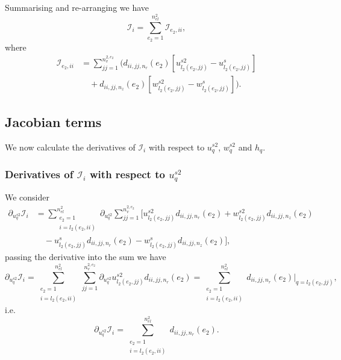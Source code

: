 \documentclass{article}
\begin{document}
Summarising and re-arranging we have
\begin{equation}
\mathcal{I}_i = \sum_{e_2=1}^{n_{el}^2} \mathcal{I}_{e_2,ii}, \tag{8.15}
\end{equation}
where
\begin{align}
\mathcal{I}_{e_2,ii} &= \sum_{jj=1}^{n_v^{2,e_2}} \Bigg( d_{ii,jj,n_r}(e_2) \left[ u_{l_2(e_2,jj)}^{s2} - u_{l_2(e_2,jj)}^s \right] \nonumber\\
&\quad + d_{ii,jj,n_z}(e_2) \left[ w_{l_2(e_2,jj)}^{s2} - w_{l_2(e_2,jj)}^s \right] \Bigg). \tag{8.16}
\end{align}

\subsection{Jacobian terms} %
We now calculate the derivatives of $\mathcal{I}_i$ with respect to $u_q^{s2}$, $w_q^{s2}$ and $h_q$.

\subsubsection{Derivatives of $\mathcal{I}_i$ with respect to $u_q^{s2}$} %
We consider
\begin{align}
\partial_{u_q^{s2}} \mathcal{I}_i &= \sum_{\substack{e_2=1\\ i=l_2(e_2,ii)}}^{n_{el}^2} \partial_{u_q^{s2}} \sum_{jj=1}^{n_v^{2,e_2}} \Bigg[ u_{l_2(e_2,jj)}^{s2} d_{ii,jj,n_r}(e_2) + w_{l_2(e_2,jj)}^{s2} d_{ii,jj,n_z}(e_2) \nonumber\\
&\quad - u_{l_2(e_2,jj)}^s d_{ii,jj,n_r}(e_2) - w_{l_2(e_2,jj)}^s d_{ii,jj,n_z}(e_2) \Bigg], \tag{8.17}
\end{align}
passing the derivative into the sum we have
\begin{equation}
\partial_{u_q^{s2}} \mathcal{I}_i = \sum_{\substack{e_2=1\\ i=l_2(e_2,ii)}}^{n_{el}^2} \sum_{jj=1}^{n_v^{2,e_2}} \partial_{u_q^{s2}} u_{l_2(e_2,jj)}^{s2} d_{ii,jj,n_r}(e_2) = \sum_{\substack{e_2=1\\ i=l_2(e_2,ii)}}^{n_{el}^2} d_{ii,jj,n_r}(e_2) \Big|_{q=l_2(e_2,jj)}, \tag{8.18}
\end{equation}
i.e.
\begin{equation}
\partial_{u_q^{s2}} \mathcal{I}_i = \sum_{\substack{e_2=1\\ i=l_2(e_2,ii)}}^{n_{el}^2} d_{ii,jj,n_r}(e_2). \tag{8.19}
\end{equation}
\end{document}
